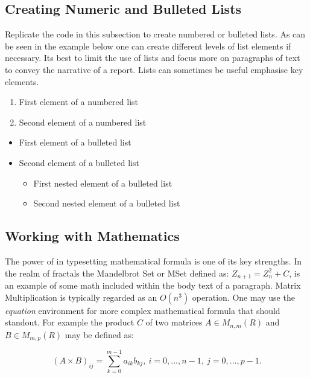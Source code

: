 \subsection{Creating Numeric and Bulleted Lists}
Replicate the code in this subsection to create numbered or bulleted lists. As can be seen in the example below one can create different levels of list elements if necessary. Its best to limit the use of lists and focus more on paragraphs of text to convey the narrative of a report. Lists can sometimes be useful emphasise key elements. 

{%
\begin{enumerate}
\item First element of a numbered list
\item Second element of a numbered list
\end{enumerate}
\begin{itemize}
\item First element of a bulleted list
\item Second element of a bulleted list
    \begin{itemize}
    \item First nested element of a bulleted list
    \item Second nested element of a bulleted list
    \end{itemize}
\end{itemize}
} %

\subsection{Working with Mathematics}\label{sec:WorkWithMath}
The power of \latex in typesetting mathematical formula is one of its key strengths. In the realm of fractals the Mandelbrot Set or MSet defined as: $Z_{n+1} =
Z_{n}^2 + C$, is an example of some math included within the body text of a paragraph. Matrix Multiplication is typically regarded as an $O(n^3)$
operation. One may use the \emph{equation} environment for more complex mathematical formula that should standout. For example the product  $C$ of two matrices $A \in M_{n,m}(R)$ and $B \in
M_{m,p}(R)$ may be defined as:

\begin{equation}
(A \times B)_{ij} = \sum_{k=0} ^{m-1} a_{ik}b_{kj},~
i=0,...,n-1,~j=0,...,p-1.
\end{equation}


